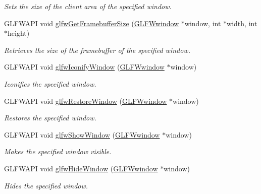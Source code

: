 \begin{DoxyCompactItemize}
\begin{DoxyCompactList}\small\item\em \-Sets the size of the client area of the specified window. \end{DoxyCompactList}\item 
\-G\-L\-F\-W\-A\-P\-I void \hyperlink{group__window_gaf7d17f3534b4b6dc9a6f905e3a240b7e}{glfw\-Get\-Framebuffer\-Size} (\hyperlink{group__window_ga3c96d80d363e67d13a41b5d1821f3242}{\-G\-L\-F\-Wwindow} $\ast$window, int $\ast$width, int $\ast$height)
\begin{DoxyCompactList}\small\item\em \-Retrieves the size of the framebuffer of the specified window. \end{DoxyCompactList}\item 
\-G\-L\-F\-W\-A\-P\-I void \hyperlink{group__window_ga24274e3c6ecd44e11fec5e6b66e4d7f3}{glfw\-Iconify\-Window} (\hyperlink{group__window_ga3c96d80d363e67d13a41b5d1821f3242}{\-G\-L\-F\-Wwindow} $\ast$window)
\begin{DoxyCompactList}\small\item\em \-Iconifies the specified window. \end{DoxyCompactList}\item 
\-G\-L\-F\-W\-A\-P\-I void \hyperlink{group__window_ga1e29caf0b819f578b04db52fff17256c}{glfw\-Restore\-Window} (\hyperlink{group__window_ga3c96d80d363e67d13a41b5d1821f3242}{\-G\-L\-F\-Wwindow} $\ast$window)
\begin{DoxyCompactList}\small\item\em \-Restores the specified window. \end{DoxyCompactList}\item 
\-G\-L\-F\-W\-A\-P\-I void \hyperlink{group__window_ga7945bcdff9e5e058cf36505d6873ed8c}{glfw\-Show\-Window} (\hyperlink{group__window_ga3c96d80d363e67d13a41b5d1821f3242}{\-G\-L\-F\-Wwindow} $\ast$window)
\begin{DoxyCompactList}\small\item\em \-Makes the specified window visible. \end{DoxyCompactList}\item 
\-G\-L\-F\-W\-A\-P\-I void \hyperlink{group__window_gaa17e287d521544bdeceafa09ac036e20}{glfw\-Hide\-Window} (\hyperlink{group__window_ga3c96d80d363e67d13a41b5d1821f3242}{\-G\-L\-F\-Wwindow} $\ast$window)
\begin{DoxyCompactList}\small\item\em \-Hides the specified window. \end{DoxyCompactList}\item 

\end{DoxyCompactItemize}

